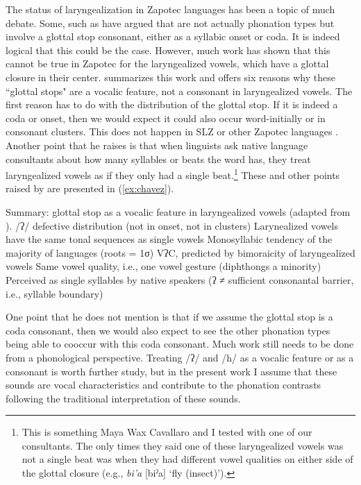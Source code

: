 The status of laryngealization in Zapotec languages has been a topic of much debate. Some, such as \citet{avelinoAcousticElectroglottographicAnalyses2010,espositoSantaAnaValle2004} have argued that are not actually phonation types but involve a glottal stop consonant, either as a syllabic onset or coda. It is indeed logical that this could be the case. However, much work has shown that this cannot be true in Zapotec for the laryngealized vowels, which have a glottal closure in their center. \citet{chavez-peonInteractionMetricalStructure2010} summarizes this work and offers six reasons why these ``glottal stops" are a vocalic feature, not a consonant in laryngealized vowels. The first reason has to do with the distribution of the glottal stop. If it is indeed a coda or onset, then we would expect it could also occur word-initially or in consonant clusters. This does not happen in SLZ or other Zapotec languages \citep{jaegerInitialConsonantClusters1982}. Another point that he raises is that when linguists ask native language consultants about how many syllables or beats the word has, they treat laryngealized vowels as if they only had a single beat.\footnote{This is something Maya Wax Cavallaro and I tested with one of our consultants. The only times they said one of these laryngealized vowels was not a single beat was when they had different vowel qualities on either side of the glottal closure (e.g., \textit{bi'a} [biˀa] `fly (insect)').} These and other points raised by \citeauthor{chavez-peonInteractionMetricalStructure2010} are presented in (\ref{ex:chavez}). 

\ea  Summary: glottal stop as a vocalic feature in laryngealized vowels (adapted from \cite{chavez-peonInteractionMetricalStructure2010}). \label{ex:chavez}
    \ea /ʔ/ defective distribution (not in onset, not in clusters)
    \ex Larynealized vowels have the same tonal sequences as single vowels
    \ex Monosyllabic tendency of the majority of languages (roots = 1σ)
    \ex *VʔC, predicted by bimoraicity of laryngealized vowels
    \ex Same vowel quality, i.e., one vowel gesture (diphthongs a minority)
    \ex Perceived as single syllables by native speakers (ʔ ≠ sufficient consonantal barrier, i.e., syllable boundary)
    \z 
\z 

One point that he does not mention is that if we assume the glottal stop is a coda consonant, then we would also expect to see the other phonation types being able to cooccur with this coda consonant. Much work still needs to be done from a phonological perspective. Treating /ʔ/ and /h/ as a vocalic feature or as a consonant is worth further study, but in the present work I assume that these sounds are vocal characteristics and contribute to the phonation contrasts following the traditional interpretation of these sounds. 

